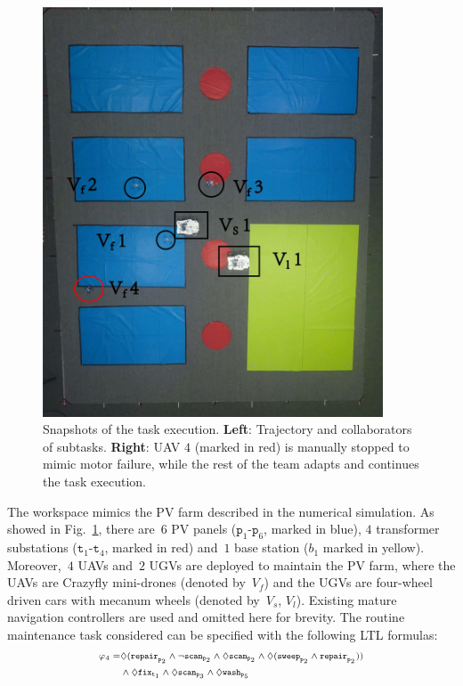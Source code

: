 \begin{figure}[t!]
\begin{minipage}[t]{0.49\linewidth}
	\includegraphics[width =0.9\textwidth]{figures/hardware_experiment/experiment2.jpg}
\end{minipage}%
\caption{Snapshots of the task execution. \textbf{Left}:
Trajectory and collaborators of subtasks.
\textbf{Right}: UAV $4$ (marked in red) is manually stopped to mimic motor failure,
while the rest of the team adapts and continues
the task execution.}
\label{fig:ws}
\end{figure}

The workspace mimics the PV farm described in the numerical simulation.
As showed in Fig.~\ref{fig:ws},
there are~$6$ PV panels ($\texttt{p}_1$-$\texttt{p}_6$, marked in blue),
$4$ transformer substations
($\texttt{t}_1$-$\texttt{t}_4$, marked in red)
and~$1$ base station ($b_1$ marked in yellow).
Moreover,~$4$ UAVs and~$2$ UGVs are deployed to maintain the PV farm,
where the UAVs are Crazyfly mini-drones (denoted by~$V_f$) and
the UGVs are four-wheel driven cars with mecanum wheels (denoted by~$V_s$, $V_l$).
Existing mature navigation controllers are used and omitted here for brevity.
The routine maintenance task considered can be specified with the following LTL formulas:
\begin{equation}\scriptsize
\begin{aligned}
	\varphi_4=& \Diamond(\texttt{repair}_{\texttt{p}_2} \land  \lnot\texttt{scan}_{\texttt{p}_2} \land \Diamond
	\texttt{scan}_{\texttt{p}_2} \land \Diamond (\texttt{sweep}_{\texttt{p}_2} \land \texttt{repair}_{\texttt{p}_2}) )\\ 
	& \land \Diamond \texttt{fix}_{\texttt{t}_1} \land \Diamond \texttt{scan}_{\texttt{p}_3}
	\land \Diamond \texttt{wash}_{\texttt{p}_5}
\end{aligned}
\end{equation}


